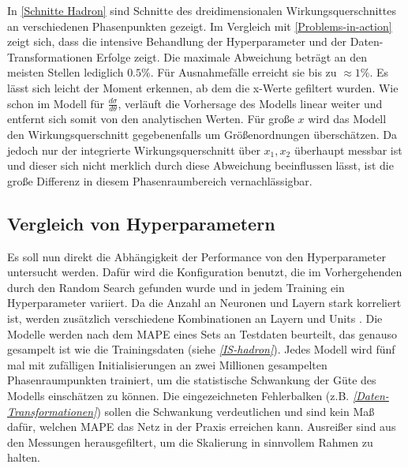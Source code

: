 In \textsf{\autoref{Schnitte Hadron}} sind Schnitte des dreidimensionalen Wirkungsquerschnittes an verschiedenen Phasenpunkten gezeigt. Im Vergleich mit \textsf{\autoref{Problems-in-action}} zeigt sich, dass die intensive Behandlung der Hyperparameter und der Daten-Transformationen Erfolge zeigt. Die maximale Abweichung beträgt an den meisten Stellen lediglich $0.5\%$. Für Ausnahmefälle erreicht sie bis zu $\approx 1\%$. Es lässt sich leicht der Moment erkennen, ab dem die x-Werte gefiltert wurden. Wie schon im Modell für $\frac{d\sigma}{d\theta}$, verläuft die Vorhersage des Modells linear weiter und entfernt sich somit von den analytischen Werten. Für große $x$ wird das Modell den Wirkungsquerschnitt gegebenenfalls um Größenordnungen überschätzen. Da jedoch nur der integrierte Wirkungsquerschnitt über $x_1, x_2$ überhaupt messbar ist und dieser sich nicht merklich durch diese Abweichung beeinflussen lässt, ist die große Differenz in diesem Phasenraumbereich vernachlässigbar. 
\subsection{Vergleich von Hyperparametern}
Es soll nun direkt die Abhängigkeit der Performance von den Hyperparameter untersucht werden. Dafür wird die Konfiguration benutzt, die im Vorhergehenden durch den Random Search gefunden wurde und in jedem Training ein Hyperparameter variiert. Da die Anzahl an Neuronen und Layern stark korreliert ist, werden zusätzlich verschiedene Kombinationen an Layern und Units . Die Modelle werden nach dem MAPE eines Sets an Testdaten beurteilt, das genauso gesampelt ist wie die Trainingsdaten (siehe \textit{\autoref{IS-hadron}}). Jedes Modell wird fünf mal mit zufälligen Initialisierungen an zwei Millionen gesampelten Phasenraumpunkten trainiert, um die statistische Schwankung der Güte des Modells einschätzen zu können. Die eingezeichneten Fehlerbalken (z.B. \textit{\autoref{Daten-Transformationen}}) sollen die Schwankung verdeutlichen und sind kein Maß dafür, welchen MAPE das Netz in der Praxis erreichen kann. Ausreißer sind aus den Messungen herausgefiltert, um die Skalierung in sinnvollem Rahmen zu halten. 

